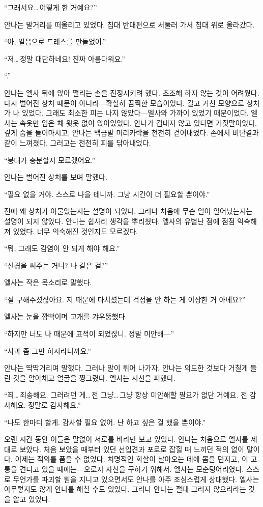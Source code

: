 ``그래서요\ldots\,어떻게 한 거예요?''

안나는 말거리를 떠올리고 있었다. 침대 반대편으로 서둘러 가서 침대 위로 올라갔다.

``아, 얼음으로 드레스를 만들었어.''

``저\ldots\,정말 대단하네요! 진짜 아름다워요.''

``.''

안나는 엘사 뒤에 앉아 떨리는 손을 진정시키려 했다. 초조해 하지 않는 것이 어려웠다. 다시 벌어진 상처 때문이 아니라—확실히 끔찍한 모습이었다. 길고 거친 모양으로 상처가 나 있었다. 그래도 최소한 피는 나지 않았다—엘사와 가까이 있었기 때문이었다. 엘사는 속옷만 입은 채 윗옷 없이 앉아있었다. 안나가 겁내지 않고 있다면 거짓말이었다. 깊게 숨을 들이마시고, 안나는 백금발 머리카락을 천천히 걷어내었다. 손에서 비단결과 같이 느껴졌다. 그러고는 천천히 피를 닦아내었다.

``붕대가 충분할지 모르겠어요.''

안나는 벌어진 상처를 보며 말했다.

``필요 없을 거야. 스스로 나을 테니까. 그냥 시간이 더 필요할 뿐이야.''

전에 왜 상처가 아물었는지는 설명이 되었다. 그러나 처음에 무슨 일이 일어났는지는 설명이 되지 않았다. 안나는 쉽사리 생각을 뿌리쳤다. 엘사의 유별난 점에 점점 익숙해져 있었다. 너무 익숙해진 것인지도 모르겠다.

``뭐, 그래도 감염이 안 되게 해야 해요.''

`` 신경을 써주는 거니? 나 같은 걸?''

엘사는 작은 목소리로 말했다.

``절 구해주셨잖아요. 저 때문에 다치셨는데 걱정을 안 하는 게 이상한 거 아녜요?''

엘사는 눈을 깜빡이며 고개를 갸우뚱했다.

``하지만 너도 나 때문에 표적이 되었잖니. 정말 미안해—''

``사과 좀 그만 하시라니까요.''

안나는 딱딱거리며 말했다. 그러나 말이 튀어 나가자, 안나는 의도한 것보다 거칠게 들린 것을 알아채고 얼굴을 찡그렸다. 엘사는 시선을 피했다.

``죄\ldots\,죄송해요. 그러려던 게\ldots\,전 그냥\ldots\,그냥 항상 미안해할 필요가 없단 거예요. 전 감사해요. 정말로 감사해요.''

`` 나도 한마디 할게. 감사할 필요 없어. 난 하고 싶은 걸 했을 뿐이야.''

오랜 시간 동안 이들은 말없이 서로를 바라만 보고 있었다. 안나는 처음으로 엘사를 제대로 보았다. 처음 보았을 때부터 있던 선입견과 포로로 잡힐 때 느끼던 적의 없이 말이다. 이제는 적의를 품을 수 없었다. 치명적인 화살이 날아오는 데에 몸을 던지고, 이 고통을 견디고 있을 때에는—오로지 자신을 구하기 위해서. 엘사는 모순덩어리였다. 스스로 무언가를 파괴할 힘을 지니고 있으면서도 안나를 아주 조심스럽게 상대했다. 엘사는 아무렇지도 않게 안나를 해칠 수도 있었다. 그러나 안나는 절대 그러지 않으리라는 것을 알고 있었다.

